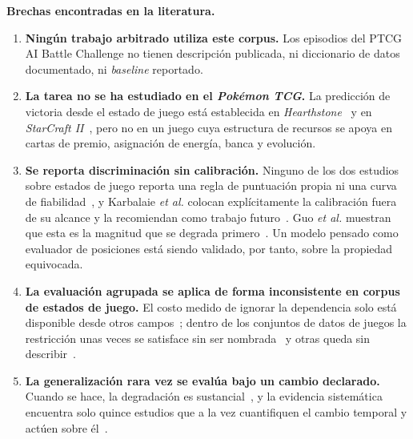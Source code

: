 \documentclass[conference]{IEEEtran}
\begin{document}
\textbf{Brechas encontradas en la literatura.}
\begin{enumerate}
  \item \textbf{Ning\'un trabajo arbitrado utiliza este corpus.} Los
        episodios del PTCG AI Battle Challenge no tienen descripci\'on
        publicada, ni diccionario de datos documentado, ni \emph{baseline}
        reportado.
  \item \textbf{La tarea no se ha estudiado en el \emph{Pok\'emon TCG}.} La
        predicci\'on de victoria desde el estado de juego est\'a establecida
        en \emph{Hearthstone}~\cite{janusz_hearthstone_2017} y en
        \emph{StarCraft II}~\cite{bialecki_sc2egset_2023}, pero no en un
        juego cuya estructura de recursos se apoya en cartas de premio,
        asignaci\'on de energ\'ia, banca y evoluci\'on.
  \item \textbf{Se reporta discriminaci\'on sin calibraci\'on.} Ninguno de
        los dos estudios sobre estados de juego reporta una regla de
        puntuaci\'on propia ni una curva de
        fiabilidad~\cite{janusz_hearthstone_2017,bialecki_sc2egset_2023}, y
        Karbalaie \textit{et al.} colocan expl\'icitamente la calibraci\'on
        fuera de su alcance y la recomiendan como trabajo
        futuro~\cite{karbalaie_participantaware_2026}. Guo \textit{et al.}
        muestran que esta es la magnitud que se degrada
        primero~\cite{guo_temporalshift_2021}. Un modelo pensado como
        evaluador de posiciones est\'a siendo validado, por tanto, sobre la
        propiedad equivocada.
  \item \textbf{La evaluaci\'on agrupada se aplica de forma inconsistente en
        corpus de estados de juego.} El costo medido de ignorar la
        dependencia solo est\'a disponible desde otros
        campos~\cite{karbalaie_participantaware_2026,sasse_leakage_2025};
        dentro de los conjuntos de datos de juegos la restricci\'on unas
        veces se satisface sin ser
        nombrada~\cite{janusz_hearthstone_2017} y otras queda sin
        describir~\cite{bialecki_sc2egset_2023}.
  \item \textbf{La generalizaci\'on rara vez se eval\'ua bajo un cambio
        declarado.} Cuando se hace, la degradaci\'on es
        sustancial~\cite{janusz_hearthstone_2017,%
        bertram_cardrepresentations_2024}, y la evidencia sistem\'atica
        encuentra solo quince estudios que a la vez cuantifiquen el cambio
        temporal y act\'uen sobre \'el~\cite{guo_temporalshift_2021}.
\end{enumerate}
\end{document}
